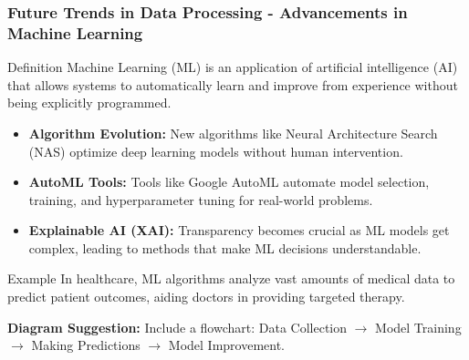\documentclass[aspectratio=169]{beamer}
\begin{document}
\begin{frame}[fragile]
    \frametitle{Future Trends in Data Processing - Advancements in Machine Learning}
    \begin{block}{Definition}
        Machine Learning (ML) is an application of artificial intelligence (AI) that allows systems to automatically learn and improve from experience without being explicitly programmed.
    \end{block}

    \begin{itemize}
        \item \textbf{Algorithm Evolution:} New algorithms like Neural Architecture Search (NAS) optimize deep learning models without human intervention.
        \item \textbf{AutoML Tools:} Tools like Google AutoML automate model selection, training, and hyperparameter tuning for real-world problems.
        \item \textbf{Explainable AI (XAI):} Transparency becomes crucial as ML models get complex, leading to methods that make ML decisions understandable.
    \end{itemize}
    
    \begin{block}{Example}
        In healthcare, ML algorithms analyze vast amounts of medical data to predict patient outcomes, aiding doctors in providing targeted therapy.
    \end{block}

    \textbf{Diagram Suggestion:} Include a flowchart: Data Collection $\to$ Model Training $\to$ Making Predictions $\to$ Model Improvement.
\end{frame}
\end{document}
